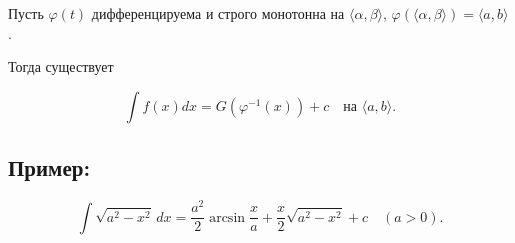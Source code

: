{Пусть \( \varphi(t) \) дифференцируема и строго монотонна на \( \langle \alpha, \beta \rangle \), \( \varphi(\langle \alpha, \beta \rangle) = \langle a, b \rangle \).

Тогда существует

\[
\int f(x)dx = G(\varphi^{-1}(x)) + c \quad \text{на } \langle a, b \rangle.
\]

\subsection*{Пример:}

\[
\int \sqrt{a^2 - x^2} \,dx = \frac{a^2}{2} \arcsin \frac{x}{a} + \frac{x}{2} \sqrt{a^2 - x^2} + c \quad (a > 0).
\]

}